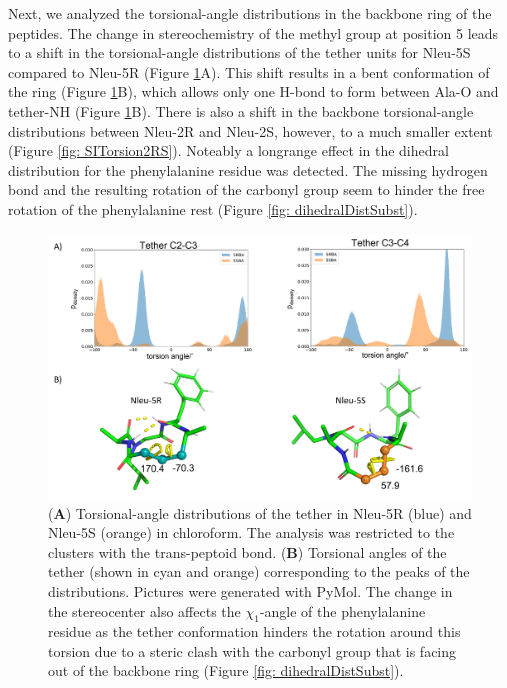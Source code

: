 Next, we analyzed the torsional-angle distributions in the backbone ring of the peptides. The change in stereochemistry of the methyl group at position 5 leads to a shift in the torsional-angle distributions of the tether units for Nleu-5S compared to Nleu-5R (Figure \ref{fig: dihedralDist}A). This shift results in a bent conformation of the ring (Figure \ref{fig: dihedralDist}B), which allows only one H-bond to form between Ala-O and tether-NH (Figure \ref{fig: dihedralDist}B). There is also a shift in the backbone torsional-angle distributions between Nleu-2R and Nleu-2S, however, to a much smaller extent (Figure \ref{fig: SITorsion2RS}). Noteably a longrange effect in the dihedral distribution for the phenylalanine residue was detected. The missing hydrogen bond and the resulting rotation of the carbonyl group seem to hinder the free rotation of the phenylalanine rest (Figure \ref{fig: dihedralDistSubst}).

\begin{figure}[h!]
    \centering
    \includegraphics[width=\textwidth]{7_chapter_5/fig/results/dihedral_dist.png}
    \caption{(\textbf{A}) Torsional-angle distributions of the tether in Nleu-5R (blue) and Nleu-5S (orange) in chloroform. The analysis was restricted to the clusters with the trans-peptoid bond. (\textbf{B}) Torsional angles of the tether (shown in cyan and orange) corresponding to the peaks of the distributions. Pictures were generated with PyMol. \cite{Delano2020} The change in the stereocenter also affects the $\chi_1$-angle of the phenylalanine residue as the tether conformation hinders the rotation around this torsion due to a steric clash with the carbonyl group that is facing out of the backbone ring (Figure \ref{fig: dihedralDistSubst}).
    }
    \label{fig: dihedralDist}
\end{figure}

